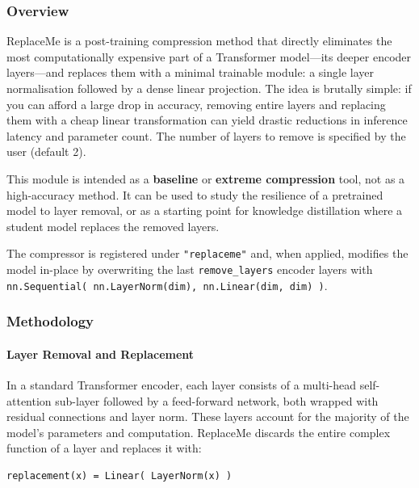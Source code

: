 \subsubsection*{Overview}

ReplaceMe is a post-training compression method that directly eliminates the most computationally expensive part of a Transformer model---its deeper encoder layers---and replaces them with a minimal trainable module: a single layer normalisation followed by a dense linear projection. The idea is brutally simple: if you can afford a large drop in accuracy, removing entire layers and replacing them with a cheap linear transformation can yield drastic reductions in inference latency and parameter count. The number of layers to remove is specified by the user (default 2).

This module is intended as a \textbf{baseline} or \textbf{extreme compression} tool, not as a high-accuracy method. It can be used to study the resilience of a pretrained model to layer removal, or as a starting point for knowledge distillation where a student model replaces the removed layers.

The compressor is registered under \texttt{"replaceme"} and, when applied, modifies the model in-place by overwriting the last \texttt{remove\_layers} encoder layers with \texttt{nn.Sequential( nn.LayerNorm(dim), nn.Linear(dim, dim) )}.


\subsubsection*{Methodology}

\paragraph{Layer Removal and Replacement}

In a standard Transformer encoder, each layer consists of a multi-head self-attention sub-layer followed by a feed-forward network, both wrapped with residual connections and layer norm. These layers account for the majority of the model's parameters and computation. ReplaceMe discards the entire complex function of a layer and replaces it with:

\vspace{0.5em}
\begin{mdframed}[backgroundcolor=codebg, linecolor=codeframe, linewidth=1pt, roundcorner=4pt, innerleftmargin=2pt, innerrightmargin=5pt, innertopmargin=5pt, innerbottommargin=5pt]
\begin{lstlisting}
replacement(x) = Linear( LayerNorm(x) )
\end{lstlisting}
\end{mdframed}
\vspace{0.5em}

